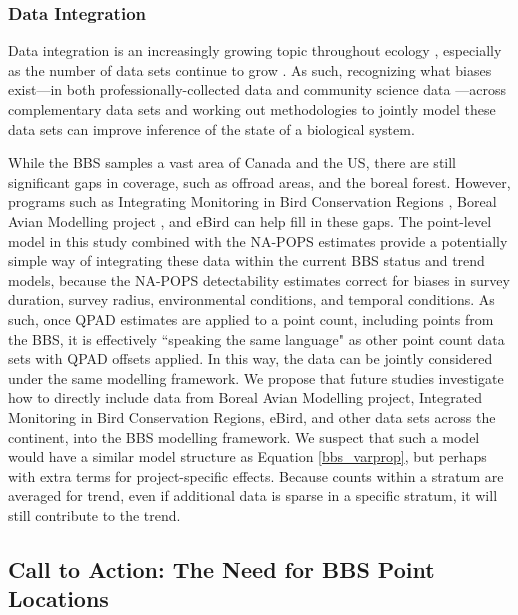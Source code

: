 \documentclass[12pt]{article}
\begin{document}
\subsubsection{Data Integration}

\par Data integration is an increasingly growing topic throughout ecology \citep{isaac_data_2020, miller_recent_2019, pacifici_integrating_2017, boersch-supan_integrating_2021}, especially as the number of data sets continue to grow \citep{binley_minimizing_2023}.
As such, recognizing what biases exist---in both professionally-collected data and community science data \citep{binley_data_2023}---across complementary data sets and working out methodologies to jointly model these data sets can improve inference of the state of a biological system.

\par While the BBS samples a vast area of Canada and the US, there are still significant gaps in coverage, such as offroad areas, and the boreal forest. 
However, programs such as Integrating Monitoring in Bird Conservation Regions \citep{pavlacky_statistically_2017}, Boreal Avian Modelling project \citep{cumming_toward_2010}, and eBird \citep{sullivan_ebird_2014} can help fill in these gaps.
The point-level model in this study combined with the NA-POPS estimates provide a potentially simple way of integrating these data within the current BBS status and trend models, because the NA-POPS detectability estimates correct for biases in survey duration, survey radius, environmental conditions, and temporal conditions.
As such, once QPAD \citep{solymos_calibrating_2013} estimates are applied to a point count, including points from the BBS, it is effectively ``speaking the same language" as other point count data sets with QPAD offsets applied.
In this way, the data can be jointly considered under the same modelling framework.
We propose that future studies investigate how to directly include data from Boreal Avian Modelling project, Integrated Monitoring in Bird Conservation Regions, eBird, and other data sets across the continent, into the BBS modelling framework.
We suspect that such a model would have a similar model structure as Equation \ref{bbs_varprop}, but perhaps with extra terms for project-specific effects.
Because counts within a stratum are averaged for trend, even if additional data is sparse in a specific stratum, it will still contribute to the trend.


\subsection{Call to Action: The Need for BBS Point Locations}
\end{document}
